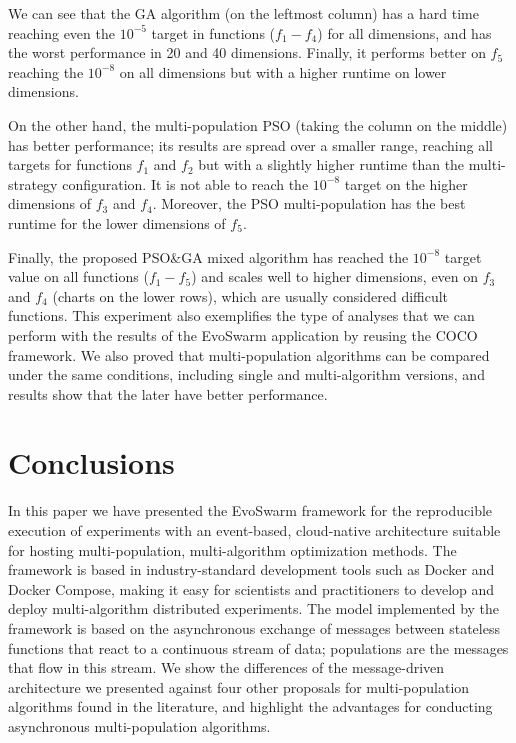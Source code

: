 \documentclass[review]{elsarticle}
\begin{document}
We can see that the GA algorithm (on the leftmost column) has a hard time reaching even the
$10^{-5}$ target in functions ($f_1-f_4$) for all dimensions, and has the worst
performance in 20 and 40 dimensions. Finally, it performs better on $f_5$
reaching the $10^{-8}$ on all dimensions but with a higher runtime on lower
dimensions.

On the other hand, the multi-population PSO (taking the column on the middle) 
has better performance; its results are spread over a smaller range,
reaching all targets for functions $f_1$ and $f_2$ but with a slightly higher
runtime than the multi-strategy configuration. It is not able to reach the
$10^{-8}$ target on the higher dimensions of $f_3$ and $f_4$. Moreover, the PSO
multi-population has the best runtime for the lower dimensions of $f_5$.

Finally, the proposed PSO\&GA mixed algorithm has reached the $10^{-8}$ target
value on all functions ($f_1-f_5$) and scales well to higher dimensions, even on
$f_3$ and $f_4$ (charts on the lower rows), which are usually considered
difficult functions. This experiment also exemplifies the type of analyses that
we can perform with the results of the EvoSwarm application by reusing the COCO framework.
We also proved that multi-population algorithms can be compared under the same 
conditions, including single and multi-algorithm versions, and results show 
that the later have better performance.


\section{Conclusions} 
\label{conclusions}

In this paper we have presented the EvoSwarm framework for 
the reproducible execution of experiments with an event-based, cloud-native architecture 
suitable for hosting multi-population, multi-algorithm optimization
methods. 
The framework is based in industry-standard development
tools such as Docker and Docker Compose, making it easy for scientists and practitioners to develop and deploy
multi-algorithm distributed experiments. The model implemented by the
framework is based on the asynchronous
exchange of messages between stateless functions that react to a continuous
stream of data; populations are the messages that flow in this stream. We show the differences of the message-driven architecture we presented against
four other proposals for multi-population algorithms found in the literature, and highlight the 
advantages for conducting asynchronous multi-population algorithms.
\end{document}
